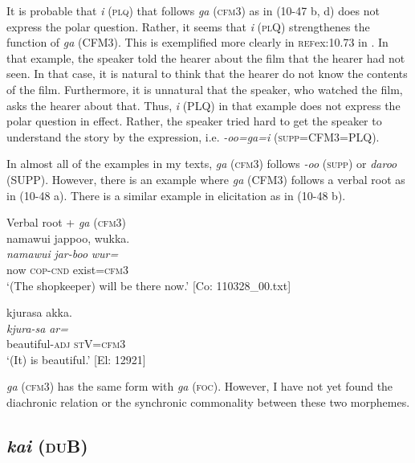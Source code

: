 It is probable that \textit{i} (\textsc{plq}) that follows \textit{ga} (\textsc{cfm}3) as in (10-47 b, d) does not express the polar question. Rather, it seems that \textit{i} (\textsc{pl}Q) strengthenes the function of \textit{ga} (CFM3). This is exemplified more clearly in \textsc{ref}{ex:10.73} in . In that example, the speaker told the hearer about the film that the hearer had not seen. In that case, it is natural to think that the hearer do not know the contents of the film. Furthermore, it is unnatural that the speaker, who watched the film, asks the hearer about that. Thus, \textit{i} (PLQ) in that example does not express the polar question in effect. Rather, the speaker tried hard to get the speaker to understand the story by the expression, i.e. \textit{{}-oo=ga=i} (\textsc{supp}=CFM3=PLQ).

In almost all of the examples in my texts, \textit{ga} (\textsc{cfm}3) follows \textit{-oo} (\textsc{supp}) or \textit{daroo} (SUPP). However, there is an example where \textit{ga} (CFM3) follows a verbal root as in (10-48 a). There is a similar example in elicitation as in (10-48 b).

\ea\label{ex:10.48}   Verbal root + \textit{ga} (\textsc{cfm}3)\\
  \ea  %
      \glll    namawui  jappoo,  wukka.\\
      \textit{namawui}  \textit{jar-boo}  \textit{wur=}\\
      now  \textsc{cop}-\textsc{cnd}  exist=\textsc{cfm}3\\
      \glt       ‘(The shopkeeper) will be there now.’ [Co: 110328\_00.txt]

  \ex  %
      \glll    kjurasa  akka.\\
      \textit{kjura-sa}  \textit{ar=}\\
      beautiful-\textsc{adj}  \textsc{st}V=\textsc{cfm}3\\
      \glt       ‘(It) is beautiful.’ [El: 12921]
    \z
\z

  \textit{ga} (\textsc{cfm}3) has the same form with \textit{ga} (\textsc{foc}). However, I have not yet found the diachronic relation or the synchronic commonality between these two morphemes.

\subsection{\textit{kai} (\textsc{du}B)}\label{sec:10.3.6}

